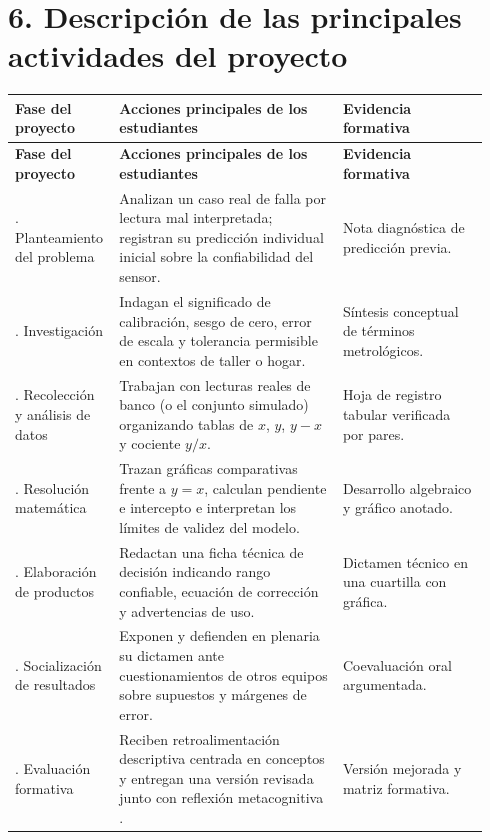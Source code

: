 \documentclass[spanish,letterpaper,oneside]{article}
\begin{document}
\section{6. Descripción de las principales actividades del proyecto}
{\small{}\renewcommand{\arraystretch}{1.3}
\begin{longtable}{|>{\raggedright\arraybackslash}p{0.18\linewidth}|>{\raggedright\arraybackslash}p{0.46\linewidth}|>{\raggedright\arraybackslash}p{0.30\linewidth}|}\hline
\rowcolor{iiiepePale} \textbf{Fase del proyecto} & \textbf{Acciones principales de los estudiantes} & \textbf{Evidencia formativa} \\\hline
\endfirsthead
\hline
\rowcolor{iiiepePale} \textbf{Fase del proyecto} & \textbf{Acciones principales de los estudiantes} & \textbf{Evidencia formativa} \\\hline
\endhead
1. Planteamiento del problema & Analizan un caso real de falla por lectura mal interpretada; registran su predicción individual inicial sobre la confiabilidad del sensor. & Nota diagnóstica de predicción previa. \\\hline
2. Investigación & Indagan el significado de calibración, sesgo de cero, error de escala y tolerancia permisible en contextos de taller o hogar. & Síntesis conceptual de términos metrológicos. \\\hline
3. Recolección y análisis de datos & Trabajan con lecturas reales de banco (o el conjunto simulado) organizando tablas de $x$, $y$, $y-x$ y cociente $y/x$. & Hoja de registro tabular verificada por pares. \\\hline
4. Resolución matemática & Trazan gráficas comparativas frente a $y=x$, calculan pendiente e intercepto e interpretan los límites de validez del modelo. & Desarrollo algebraico y gráfico anotado. \\\hline
5. Elaboración de productos & Redactan una ficha técnica de decisión indicando rango confiable, ecuación de corrección y advertencias de uso. & Dictamen técnico en una cuartilla con gráfica. \\\hline
6. Socialización de resultados & Exponen y defienden en plenaria su dictamen ante cuestionamientos de otros equipos sobre supuestos y márgenes de error. & Coevaluación oral argumentada. \\\hline
7. Evaluación formativa & Reciben retroalimentación descriptiva centrada en conceptos y entregan una versión revisada junto con reflexión metacognitiva \citep{eef2021feedback}. & Versión mejorada y matriz formativa. \\\hline
\end{longtable}}
\end{document}
